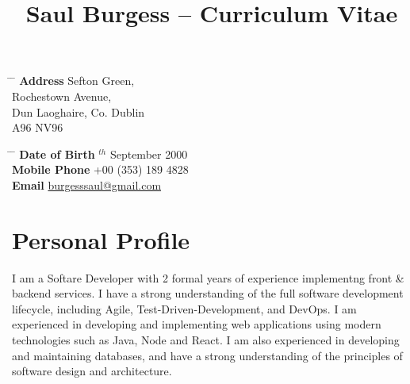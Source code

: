 \documentclass[10pt]{article} %
\begin{document}

\title{Saul Burgess -- Curriculum Vitae} %


\parbox{0.5\textwidth}{ %
    \begin{tabbing} %
        \hspace{3cm} \= \hspace{4cm} \= \kill %
        {\bf Address}  Sefton Green,\\ %
        \> Rochestown Avenue, \\
        \> Dun Laoghaire, Co. Dublin \\ %
        \> A96 NV96 \\
    \end{tabbing}}
\hfill %
\parbox{0.5\textwidth}{ %
    \begin{tabbing} %
        \hspace{3cm} \= \hspace{4cm} \= \kill %
        {\bf Date of Birth} $^{th}$ September 2000 \\ %
        {\bf Mobile Phone} \> +00 (353) 189 4828 \\ %
        {\bf Email} \> \href{mailto:burgesssaul@gmail.com}{burgesssaul@gmail.com} \\ %
    \end{tabbing}}


\section{Personal Profile}

I am a Softare Developer with 2 formal years of experience implementng front \& backend services. I have a strong understanding of the full software development lifecycle, including Agile, Test-Driven-Development, and DevOps. I am experienced in developing and implementing web applications using modern technologies such as Java, Node and React. I am also experienced in developing and maintaining databases, and have a strong understanding of the principles of software design and architecture.
\end{document}
